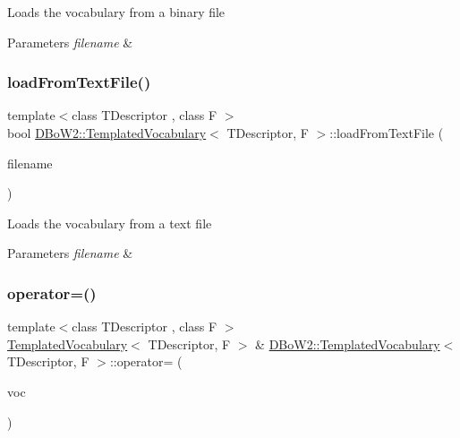 Loads the vocabulary from a binary file 
\begin{DoxyParams}{Parameters}
{\em filename} & \\
\hline
\end{DoxyParams}
\mbox{\label{class_d_bo_w2_1_1_templated_vocabulary_a5447d0744100254c4da88ea039fb3414}} 
\subsubsection{\texorpdfstring{load\+From\+Text\+File()}{loadFromTextFile()}}
{\footnotesize\ttfamily template$<$class T\+Descriptor , class F $>$ \\
bool \mbox{\hyperlink{class_d_bo_w2_1_1_templated_vocabulary}{D\+Bo\+W2\+::\+Templated\+Vocabulary}}$<$ T\+Descriptor, F $>$\+::load\+From\+Text\+File (\begin{DoxyParamCaption}\item[{const std\+::string \&}]{filename }\end{DoxyParamCaption})}

Loads the vocabulary from a text file 
\begin{DoxyParams}{Parameters}
{\em filename} & \\
\hline
\end{DoxyParams}
\mbox{\label{class_d_bo_w2_1_1_templated_vocabulary_a5355c25b6f37c11acffe48996e19323f}} 
\subsubsection{\texorpdfstring{operator=()}{operator=()}}
{\footnotesize\ttfamily template$<$class T\+Descriptor , class F $>$ \\
\mbox{\hyperlink{class_d_bo_w2_1_1_templated_vocabulary}{Templated\+Vocabulary}}$<$ T\+Descriptor, F $>$ \& \mbox{\hyperlink{class_d_bo_w2_1_1_templated_vocabulary}{D\+Bo\+W2\+::\+Templated\+Vocabulary}}$<$ T\+Descriptor, F $>$\+::operator= (\begin{DoxyParamCaption}\item[{const \mbox{\hyperlink{class_d_bo_w2_1_1_templated_vocabulary}{Templated\+Vocabulary}}$<$ T\+Descriptor, F $>$ \&}]{voc }\end{DoxyParamCaption})}

